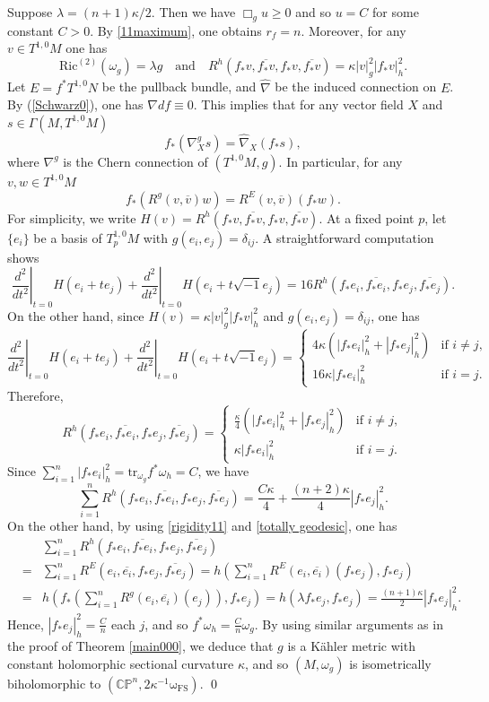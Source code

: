 \documentclass[12pt]{amsart}
\theoremstyle{plain}
\theoremstyle{definition}
\newcommand{\sq}{\sqrt{-1}}
\renewcommand{\bar}{\overline}
\newcommand{\beq}{\begin{equation}}
\newcommand{\eeq}{\end{equation}}
\newcommand{\ee}{\end{eqnarray*}}
\newcommand{\be}{\begin{eqnarray*}}
\renewcommand{\hat}{\widehat}
\newcommand{\qtq}[1]{\quad\mbox{#1}\quad}
\renewcommand{\>}{\rightarrow}
\newcommand{\C}{{\mathbb C}}
\renewcommand{\P}{{\mathbb P}}
\newcommand{\Ric}{\mathrm{Ric}}
\newcommand{\om}{\omega}
\numberwithin{equation}{section} %
\begin{document}
Suppose $\lambda=(n+1)\kappa/2$.
Then we have $\Box_g u\ge 0$ and so $u=C$ for some constant $C>0$.
By \eqref{11maximum}, one obtains $r_f=n$.
Moreover, for any $v\in T^{1,0}M$ one has 
\beq 
\Ric^{\mathrm{(2)}}(\om_g)=\lambda g\qtq{and} R^{h}\left(f_*v,\bar {f_*v}, f_*v,\bar {f_*v}\right)= \kappa |v|^2_g |f_*v|^2_h.
\label{rigidity11}
\eeq 	
Let $E=f^*T^{1,0}N$ be the pullback bundle, and $\hat\nabla$ be the induced connection on $E$.
By (\ref{Schwarz0}),  one has  $\nabla df\equiv 0$.
This implies that for any vector field $X$ and $s\in \Gamma(M, T^{1,0}M)$ $$f_*(\nabla_X^gs)=\hat\nabla_X(f_*s),$$ 
where $\nabla^g$ is the Chern connection of $(T^{1,0}M,g)$.
In particular, for any $v,w\in T^{1,0}M$
\beq 
f_*\left( R^g(v,\bar v)w \right) =R^{E}(v,\bar v)(f_*w) .
\label{totally geodesic}
\eeq
For simplicity, we write $H(v)=R^h\left(f_*v,\bar {f_*v}, f_*v,\bar {f_*v}\right)$.
At a fixed point $p$, let $\{e_i\}$ be a basis of $T_p^{1,0}M$ with $g(e_i,e_j)=\delta_{ij}$.
A straightforward computation shows
\[ 
\left.\frac{d^2}{dt^2}\right|_{t=0} H(e_i+te_j)
+\left.\frac{d^2}{dt^2}\right|_{t=0} H\left(e_i+t\sq e_j\right)
=16R^h\left(f_*e_i,\bar{f_*e_i},f_*e_j,\bar{f_*e_j}\right).
\] 
On the other hand, since $H(v)=\kappa |v|^2_g |f_*v|^2_h$ and $g(e_i,e_j)=\delta_{ij}$, one has
\[ 
\left.\frac{d^2}{dt^2}\right|_{t=0} H(e_i+te_j)
+\left.\frac{d^2}{dt^2}\right|_{t=0} H\left(e_i+t\sq e_j\right)
=\begin{cases}
4\kappa\left(\left|f_*e_i\right|_h^2+\left|f_*e_j\right|_h^2\right)&\text{if $i\ne j$,} \\
16\kappa\left|f_*e_i\right|_h^2 &\text{if $i=j$.} 
\end{cases}
\] 
Therefore, 
\[
R^h\left(f_*e_i,\bar{f_*e_i},f_*e_j,\bar{f_*e_j}\right)=
\begin{cases}
\frac{\kappa}{4}\left(\left|f_*e_i\right|_h^2+\left|f_*e_j\right|_h^2\right) &\text{if $i\ne j$}, \\
\kappa\left|f_*e_i\right|_h^2 &\text{if $i=j$.} 
\end{cases}
\]
Since $\sum_{i=1}^n\left|f_*e_i\right|_h^2=\mathrm{tr}_{\om_g}f^*\om_h=C$, we have 
\beq 
\sum_{i=1}^n R^h\left(f_*e_i,\bar{f_*e_i},f_*e_j,\bar{f_*e_j}\right)
=\frac{C\kappa }{4}+\frac{(n+2)\kappa}{4} \left|f_*e_j\right|_h^2.
\eeq 
On the other hand,  by using \eqref{rigidity11} and \eqref{totally geodesic}, one has
\be &&
\sum_{i=1}^n R^h\left(f_*e_i,\bar{f_*e_i},f_*e_j,\bar{f_*e_j}\right)\\
&=& \sum_{i=1}^n R^E\left(e_i,\bar{e_i},f_*e_j,\bar{f_*e_j}\right)
=h\left( \sum_{i=1}^n R^E(e_i,\bar{e_i})(f_*e_j),f_*e_j\right)\\
&=& h\left(  f_*\left(\sum_{i=1}^n R^g(e_i,\bar{e_i})(e_j)\right),f_*e_j\right)
= h\left( \lambda f_*e_j ,f_*e_j\right)
= \frac{(n+1)\kappa}{2}\left|f_*e_j\right|_h^2.
\ee  
Hence, $|f_*e_j|_h^2=\frac{C}{n}$ each $j$, and so $f^*\om_h=\frac{C}{n}\om_g$. 
By using similar arguments as in the proof of Theorem \ref{main000}, we deduce that $g$ is a K\"ahler metric  with constant holomorphic sectional curvature $\kappa$,
and so $(M,\om_g)$ is isometrically biholomorphic to $\left(\C\P^n,2\kappa^{-1}\mathrm{\om_{\mathrm{FS}}}\right)$. \qed 
\end{document}
